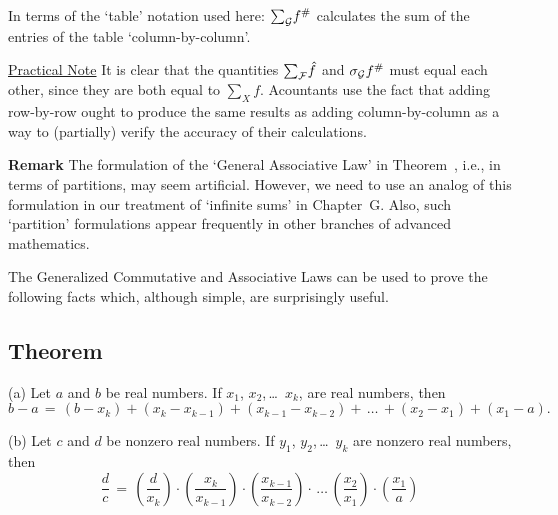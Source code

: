 {        In terms of the `table' notation used here: ${\sum}_{{\cal G}} f^{\#}$ calculates the sum of the entries of the table `column-by-column'.

        \underline{Practical Note} It is clear that the quantities ${\sum}_{{\cal F}} \hat{f}$ and ${\sigma}_{{\cal G}} f^{\#}$ must equal each other, since they are both equal to ${\sum}_{X} f$.
    Acountants use the fact that adding row-by-row ought to produce the same results as adding column-by-column as a way to (partially) verify the accuracy of their calculations.

\V
\V

        {\bf Remark} The formulation of the `General Associative Law' in Theorem~, i.e., in terms of partitions,
    may seem artificial.
    However, we need to use an analog of this formulation in our treatment of `infinite sums' in Chapter~G.
    Also, such `partition' formulations appear frequently in other branches of advanced mathematics.

\V
\V

        The Generalized Commutative and Associative Laws can be used to prove the following facts which, although simple, are surprisingly useful.

\V

        \subsection{\small{{\bf Theorem}}}
        \label{ThmB10.100}

\V

\hspace*{\parindent}(a) Let $a$ and $b$ be real numbers. If $x_{1}$, $x_{2}$,\,{\ldots}\, $x_{k}$, are real numbers, then
        \begin{displaymath}
        b-a \,=\, (b-x_{k}) + (x_{k}-x_{k-1}) + (x_{k-1}-x_{k-2}) + \,{\ldots}\, + (x_{2}-x_{1}) + (x_{1}-a).
        \end{displaymath}

\V

        (b) Let $c$ and $d$ be nonzero real numbers. If $y_{1}$, $y_{2}$,\,{\ldots}\, $y_{k}$ are nonzero real numbers, then
        \begin{displaymath}
        \frac{d}{c} \,=\, \left(\frac{d}{x_{k}}\right){\cdot} 
                          \left(\frac{x_{k}}{x_{k-1}}\right){\cdot}
                          \left(\frac{x_{k-1}}{x_{k-2}}\right){\cdot}
        \,{\ldots}\,
                          \left(\frac{x_{2}}{x_{1}}\right){\cdot}
                          \left(\frac{x_{1}}{a}\right)
        \end{displaymath}

}
